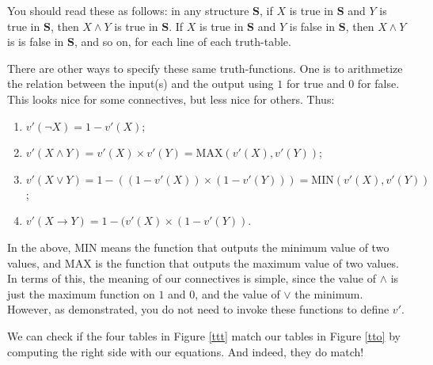 You should read these as follows: in any structure $\mathbf{S}$, if $X$ is true in $\mathbf{S}$ and $Y$ is true in $\mathbf{S}$, then $X \wedge Y$ is true in $\mathbf{S}$. If $X$ is true in $\mathbf{S}$ and $Y$ is false in $\mathbf{S}$, then $X \wedge Y$ is is false in $\mathbf{S}$, and so on, for each line of each truth-table. 

There are other ways to specify these same truth-functions. One is to arithmetize the relation between the input(s) and the output using $1$ for true and $0$ for false. This looks nice for some connectives, but less nice for others. Thus: 

\begin{enumerate}
	\item $v'(\neg X)=1-v'(X)$;
	\item $v'(X \wedge Y)=v'(X)\times v'(Y)=\text{MAX}(v'(X),v'(Y))$;
	\item $v'(X \vee Y)=1-((1-v'(X)) \times (1-v'(Y)))=\text{MIN}(v'(X), v'(Y))$;
	\item $v'(X \rightarrow Y)=1 - (v'(X) \times (1-v'(Y))$. 
\end{enumerate}

\begin{remark}
In the above, $\text{MIN}$ means the function that outputs the minimum value of two values, and $\text{MAX}$ is the function that outputs the maximum value of two values. In terms of this, the meaning of our connectives is simple, since the value of $\wedge$ is just the maximum function on $1$ and $0$, and the value of $\vee$ the minimum. However, as demonstrated, you do not need to invoke these functions to define $v'$. 
\end{remark}

We can check if the four tables in Figure \ref{ttt} match our tables in Figure \ref{tto} by computing the right side with our equations. And indeed, they do match! 

